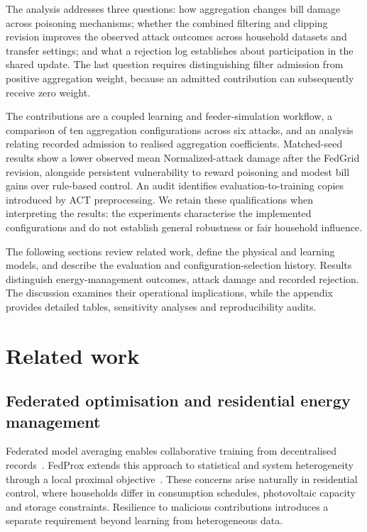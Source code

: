 \documentclass[preprint,12pt,a4paper]{elsarticle}
\begin{document}
The analysis addresses three questions: how aggregation changes bill damage across poisoning mechanisms; whether the combined filtering and clipping revision improves the observed attack outcomes across household datasets and transfer settings; and what a rejection log establishes about participation in the shared update. The last question requires distinguishing filter admission from positive aggregation weight, because an admitted contribution can subsequently receive zero weight.

The contributions are a coupled learning and feeder-simulation workflow, a comparison of ten aggregation configurations across six attacks, and an analysis relating recorded admission to realised aggregation coefficients. Matched-seed results show a lower observed mean Normalized-attack damage after the FedGrid revision, alongside persistent vulnerability to reward poisoning and modest bill gains over rule-based control. An audit identifies evaluation-to-training copies introduced by ACT preprocessing. We retain these qualifications when interpreting the results: the experiments characterise the implemented configurations and do not establish general robustness or fair household influence.

The following sections review related work, define the physical and learning models, and describe the evaluation and configuration-selection history. Results distinguish energy-management outcomes, attack damage and recorded rejection. The discussion examines their operational implications, while the appendix provides detailed tables, sensitivity analyses and reproducibility audits.



\section{Related work}
\label{sec:related}
\subsection{Federated optimisation and residential energy management}
Federated model averaging enables collaborative training from decentralised records~\cite{fedavg}. FedProx extends this approach to statistical and system heterogeneity through a local proximal objective~\cite{fedprox}. These concerns arise naturally in residential control, where households differ in consumption schedules, photovoltaic capacity and storage constraints. Resilience to malicious contributions introduces a separate requirement beyond learning from heterogeneous data.
\end{document}
